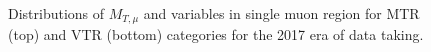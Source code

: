 \begin{figure}[htbp]
{    }
  \caption{Distributions of $M_{T,\mu}$ and \mindphinomu variables in single muon region for MTR (top) and VTR (bottom) categories for the 2017 era of data taking.}
  \label{fig:2017_Wmunu_2}
\end{figure}

